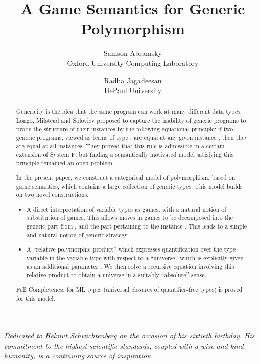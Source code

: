 \documentclass[a4paper,11pt]{article}
\title{A Game Semantics for Generic Polymorphism}
\author{Samson Abramsky\\
Oxford University Computing Laboratory\\
\and
Radha Jagadeesan\\
DePaul University}
\date{}
\begin{document}
\maketitle

\begin{center}
\textit{Dedicated to Helmut Schwichtenberg on the occasion of his
  sixtieth birthday. His commitment to the highest scientific
  standards, coupled with a wise and kind humanity, is a continuing
  source of inspiration.}
\end{center}

\begin{abstract}
Genericity is the idea that the same program can work at many
different data types.  Longo, Milstead and Soloviev proposed to capture the
inability of generic programs to probe the structure of their
instances by the following equational principle: if two generic
programs, viewed as terms of type , are equal
at any given instance , then they are equal at all
instances. They proved that this rule is admissible in a certain
extension of System F, but finding a semantically motivated model
satisfying this principle remained an open problem.

In the present paper, we construct a categorical
model of polymorphism, based on game semantics, which contains a
large collection of generic types. This model builds on two novel
constructions:
\begin{itemize}
\item A direct interpretation of variable types as games, with a
  natural notion of substitution of games. This allows moves in
  games  to be decomposed into the generic part from , and
  the part pertaining to the instance . This leads to a
  simple and natural notion of generic strategy.

\item A ``relative polymorphic product''
   which expresses quantification over the type variable
   in the variable type  with respect to a ``universe'' which
  is explicitly given as an additional parameter . We then solve a
  recursive equation involving this relative product to obtain a
  universe in a suitably ``absolute'' sense.
  \end{itemize}
Full Completeness for ML types (universal closures of
quantifier-free types) is proved for this model.
\end{abstract}
\end{document}

